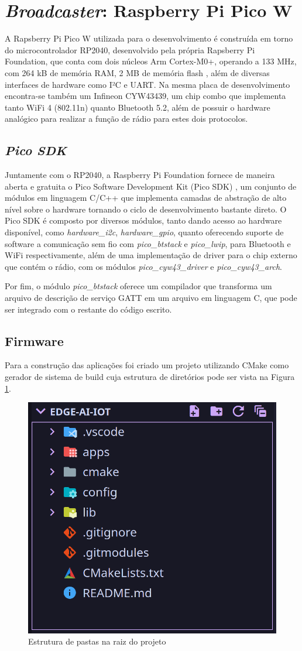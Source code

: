 \documentclass[a5paper]{ufsc-thesis}  %
\begin{document}
\section{\textit{Broadcaster}: Raspberry Pi Pico W}
A Rapsberry Pi Pico W utilizada para o desenvolvimento é construída em torno do microcontrolador RP2040, desenvolvido pela própria Rapsberry Pi Foundation, que conta com dois núcleos Arm Cortex-M0+, operando a 133 MHz, com 264 kB de memória RAM, 2 MB de memória flash \cite{picow_datasheet}, além de diversas interfaces de hardware como I²C e UART. Na mesma placa de desenvolvimento encontra-se também um Infineon CYW43439, um chip combo que implementa tanto WiFi 4 (802.11n) quanto Bluetooth 5.2, além de possuir o hardware analógico para realizar a função de rádio para estes dois protocolos.

\subsection{\textit{Pico SDK}}
Juntamente com o RP2040, a Raspberry Pi Foundation fornece de maneira aberta e gratuita o Pico Software Development Kit (Pico SDK) \cite{picosdk_datasheet}, um conjunto de módulos em linguagem C/C++ que implementa camadas de abstração de alto nível sobre o hardware tornando o ciclo de desenvolvimento bastante direto. O Pico SDK é composto por diversos módulos, tanto dando acesso ao hardware disponível, como \textit{hardware\_i2c}, \textit{hardware\_gpio}, quanto oferecendo suporte de software a comunicação sem fio com \textit{pico\_btstack} e \textit{pico\_lwip}, para Bluetooth e WiFi respectivamente, além de uma implementação de driver para o chip externo que contém o rádio, com os módulos \textit{pico\_cyw43\_driver} e \textit{pico\_cyw43\_arch}.

Por fim, o módulo \textit{pico\_btstack} oferece um compilador que transforma um arquivo de descrição de serviço GATT em um arquivo em linguagem C, que pode ser integrado com o restante do código escrito.

\subsection{Firmware}
Para a construção das aplicações foi criado um projeto utilizando CMake como gerador de sistema de build cuja estrutura de diretórios pode ser vista na Figura \ref{fig:repo}. 

\begin{figure}[h]
    \centering
    \includegraphics[width=0.5\linewidth]{imagens/repo.png}
    \caption{Estrutura de pastas na raiz do projeto}
    \label{fig:repo}
\end{figure}
\end{document}
